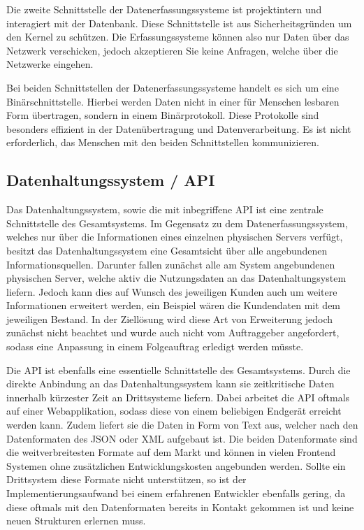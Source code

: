 Die zweite Schnittstelle der Datenerfassungssysteme ist projektintern und
interagiert mit der Datenbank. Diese Schnittstelle ist aus Sicherheitsgründen
 um den Kernel zu schützen. Die
Erfassungssysteme können also nur Daten über das Netzwerk verschicken, jedoch
akzeptieren Sie keine Anfragen, welche über die Netzwerke eingehen.

Bei beiden Schnittstellen der Datenerfassungssysteme handelt es sich um eine
Binärschnittstelle. Hierbei werden Daten nicht in einer für Menschen lesbaren
Form übertragen, sondern in einem Binärprotokoll. Diese Protokolle sind
besonders effizient in der Datenübertragung und Datenverarbeitung. Es ist nicht
erforderlich, das Menschen mit den beiden Schnittstellen kommunizieren.
\tm%

\subsection{Datenhaltungssystem / API}
Das Datenhaltungssystem, sowie die mit inbegriffene API ist eine zentrale
Schnittstelle des Gesamtsystems. Im Gegensatz zu dem Datenerfassungssystem,
welches nur über die Informationen eines einzelnen physischen Servers verfügt,
besitzt das Datenhaltungssystem eine Gesamtsicht über alle angebundenen
Informationsquellen. Darunter fallen zunächst alle am System angebundenen
physischen Server, welche aktiv die Nutzungsdaten an das Datenhaltungsystem
liefern. Jedoch kann dies auf Wunsch des jeweiligen Kunden auch um weitere
Informationen erweitert werden, ein Beispiel wären die Kundendaten mit dem
jeweiligen Bestand. In der Ziellösung wird diese Art von Erweiterung
jedoch zunächst nicht beachtet und wurde auch nicht vom Auftraggeber
angefordert, sodass eine Anpassung in einem Folgeauftrag erledigt werden
müsste.

Die API ist ebenfalls eine essentielle Schnittstelle des Gesamtsystems. Durch
die direkte Anbindung an das Datenhaltungssystem kann sie zeitkritische Daten
innerhalb kürzester Zeit an Drittsysteme liefern. Dabei arbeitet die API
oftmals auf einer Webapplikation, sodass diese von einem beliebigen Endgerät
erreicht werden kann. Zudem liefert sie die Daten in Form von Text aus, welcher
nach den Datenformaten des \gls{JSON} oder \gls{XML} aufgebaut ist. Die beiden
Datenformate sind die weitverbreitesten Formate auf dem Markt und können in
vielen Frontend Systemen ohne zusätzlichen Entwicklungskosten angebunden
werden.  Sollte ein Drittsystem diese Formate nicht unterstützen, so ist der
Implementierungsaufwand bei einem erfahrenen Entwickler ebenfalls gering, da
diese oftmals mit den Datenformaten bereits in Kontakt gekommen ist und keine
neuen Strukturen erlernen muss.
\nl%

